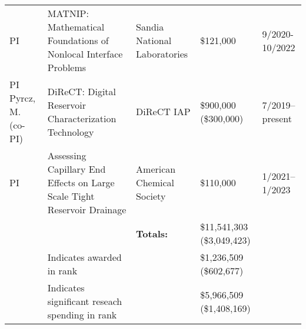 {\begin{center}
\begin{longtable}{p{1.7cm}p{6.5cm}p{3cm}P{1.5cm}p{1.0cm}}
      PI & MATNIP: Mathematical Foundations of Nonlocal Interface Problems & Sandia National Laboratories &  \$121,000 & 9/2020-10/2022 \\
      PI \newline Pyrcz, \newline M. (co-PI) & DiReCT: Digital Reservoir Characterization Technology & DiReCT IAP & \$900,000 \newline (\$300,000) & 7/2019--present \\
      PI & Assessing Capillary End Effects on Large Scale Tight Reservoir Drainage &  American Chemical Society &  \$110,000 & 1/2021--1/2023 \\
      \midrule
      {} & {} & \textbf{Totals:} & \$11,541,303 \newline (\$3,049,423) & {} \\
         & Indicates awarded in rank & {} & \$1,236,509 \newline (\$602,677) & \\
         & Indicates significant reseach spending in rank &  {} & \$5,966,509 \newline (\$1,408,169)  & \\
      \bottomrule
    \end{longtable}
  \end{center}
}
\else
\ifdefined\ispdf
